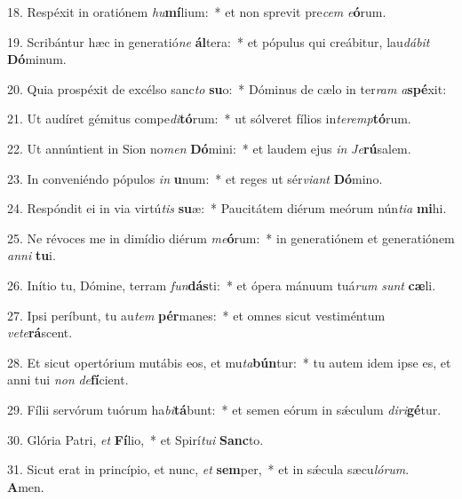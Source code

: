 18. Respéxit in oratiónem \textit{hu}\textbf{mí}lium:~*  et non sprevit pre\textit{cem} \textit{e}\textbf{ó}rum.\

19. Scribántur hæc in generatió\textit{ne} \textbf{ál}tera:~*  et pópulus qui creábitur, lau\textit{dá}\textit{bit} \textbf{Dó}minum.\

20. Quia prospéxit de excélso sanc\textit{to} \textbf{su}o:~*  Dóminus de cælo in ter\textit{ram} \textit{a}\textbf{spé}xit:\

21. Ut audíret gémitus compe\textit{di}\textbf{tó}rum:~*  ut sólveret fílios in\textit{ter}\textit{emp}\textbf{tó}rum.\

22. Ut annúntient in Sion no\textit{men} \textbf{Dó}mini:~*  et laudem ejus \textit{in} \textit{Je}\textbf{rú}salem.\

23. In conveniéndo pópulos \textit{in} \textbf{u}num:~*  et reges ut sér\textit{vi}\textit{ant} \textbf{Dó}mino.\

24. Respóndit ei in via virtú\textit{tis} \textbf{su}æ:~*  Paucitátem diérum meórum nún\textit{ti}\textit{a} \textbf{mi}hi.\

25. Ne révoces me in dimídio diérum \textit{me}\textbf{ó}rum:~*  in generatiónem et generatiónem \textit{an}\textit{ni} \textbf{tu}i.\

26. Inítio tu, Dómine, terram \textit{fun}\textbf{dás}ti:~*  et ópera mánuum tuá\textit{rum} \textit{sunt} \textbf{cæ}li.\

27. Ipsi períbunt, tu au\textit{tem} \textbf{pér}manes:~*  et omnes sicut vestiméntum \textit{ve}\textit{te}\textbf{rá}scent.\

28. Et sicut opertórium mutábis eos, et mu\textit{ta}\textbf{bún}tur:~*  tu autem idem ipse es, et anni tui \textit{non} \textit{de}\textbf{fí}cient.\

29. Fílii servórum tuórum ha\textit{bi}\textbf{tá}bunt:~*  et semen eórum in sǽculum \textit{di}\textit{ri}\textbf{gé}tur.\

30. Glória Patri, \textit{et} \textbf{Fí}lio,~*  et Spirí\textit{tu}\textit{i} \textbf{Sanc}to.\

31. Sicut erat in princípio, et nunc, \textit{et} \textbf{sem}per,~*  et in sǽcula sæcu\textit{ló}\textit{rum}. \textbf{A}men.\

